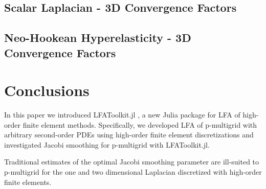\documentclass[review]{siamart190516}
\begin{document}
\subsection{Scalar Laplacian - 3D Convergence Factors}\label{sec:3dresults}

\subsection{Neo-Hookean Hyperelasticity - 3D Convergence Factors}\label{sec:solidsresults}

\section{Conclusions}\label{sec:conclusion}

In this paper we introduced LFAToolkit.jl \cite{thompson2021toolkit}, a new Julia package for LFA of high-order finite element methods.
Specifically, we developed LFA of p-multigrid with arbitrary second-order PDEs using high-order finite element discretizations and investigated Jacobi smoothing for p-multigrid with LFAToolkit.jl.

Traditional estimates of the optimal Jacobi smoothing parameter are ill-suited to p-multigrid for the one and two dimensional Laplacian discretized with high-order finite elements.



\end{document}
